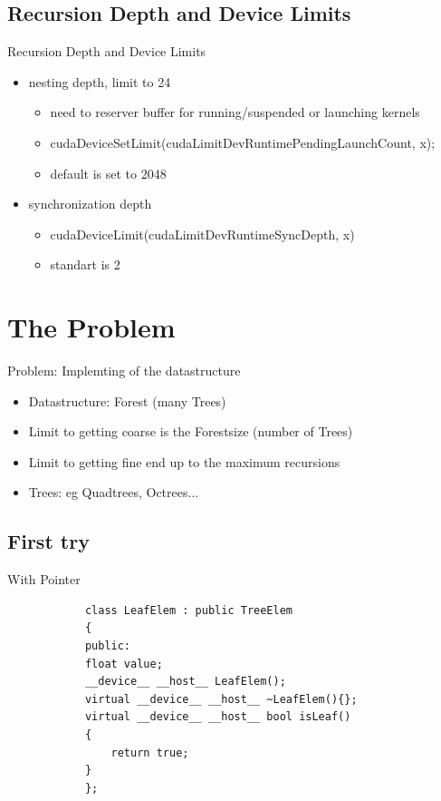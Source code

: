 \documentclass[fleqn,11pt,aspectratio=43]{beamer}
\begin{document}
\subsection{Recursion Depth and Device Limits}
\begin{frame}[fragile]{Recursion Depth and Device Limits}
	\begin{itemize}
		\item nesting depth, limit to 24
			\begin{itemize}
				\item need to reserver buffer for running/suspended or launching kernels
				\item cudaDeviceSetLimit(cudaLimitDevRuntimePendingLaunchCount, x);
				\item default is set to 2048
			\end{itemize}
		\item synchronization depth
			\begin{itemize}
				\item cudaDeviceLimit(cudaLimitDevRuntimeSyncDepth, x)
				\item standart is 2
			\end{itemize}
	\end{itemize}
\end{frame}


\section{The Problem}
	\begin{frame}{Problem: Implemting of the datastructure}
		\begin{itemize}
			\item Datastructure: Forest (many Trees)
			\item Limit to getting coarse is the Forestsize (number of Trees)
			\item Limit to getting fine end up to the maximum recursions
			\item Trees: eg Quadtrees, Octrees...
		\end{itemize}		
	\end{frame}
\subsection{First try}

\begin{frame}[fragile]{With Pointer}
	\begin{verbatim}
			class LeafElem : public TreeElem
			{
			public:
  			float value;
  			__device__ __host__ LeafElem();
  			virtual __device__ __host__ ~LeafElem(){};
  			virtual __device__ __host__ bool isLeaf()
  			{
    			return true;
  			}
			};
	\end{verbatim}
\end{frame}
\end{document}
